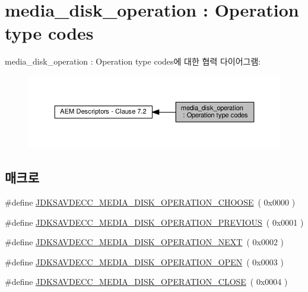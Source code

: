 \hypertarget{group__media__disk__operation}{}\section{media\+\_\+disk\+\_\+operation \+: Operation type codes}
\label{group__media__disk__operation}
media\+\_\+disk\+\_\+operation \+: Operation type codes에 대한 협력 다이어그램\+:
\nopagebreak
\begin{figure}[H]
\begin{center}
\leavevmode
\includegraphics[width=350pt]{group__media__disk__operation}
\end{center}
\end{figure}
\subsection*{매크로}
\begin{DoxyCompactItemize}
\item 
\#define \hyperlink{group__media__disk__operation_ga3db418f81f1a3824a26ede213fb10cc9}{J\+D\+K\+S\+A\+V\+D\+E\+C\+C\+\_\+\+M\+E\+D\+I\+A\+\_\+\+D\+I\+S\+K\+\_\+\+O\+P\+E\+R\+A\+T\+I\+O\+N\+\_\+\+C\+H\+O\+O\+SE}~( 0x0000 )
\item 
\#define \hyperlink{group__media__disk__operation_gab494629109de2f7fd88079bbaa158b0e}{J\+D\+K\+S\+A\+V\+D\+E\+C\+C\+\_\+\+M\+E\+D\+I\+A\+\_\+\+D\+I\+S\+K\+\_\+\+O\+P\+E\+R\+A\+T\+I\+O\+N\+\_\+\+P\+R\+E\+V\+I\+O\+US}~( 0x0001 )
\item 
\#define \hyperlink{group__media__disk__operation_ga3e29e57c7675966b8cc94bf4ff3e8062}{J\+D\+K\+S\+A\+V\+D\+E\+C\+C\+\_\+\+M\+E\+D\+I\+A\+\_\+\+D\+I\+S\+K\+\_\+\+O\+P\+E\+R\+A\+T\+I\+O\+N\+\_\+\+N\+E\+XT}~( 0x0002 )
\item 
\#define \hyperlink{group__media__disk__operation_gab338c10f22049fd6b89a66e4e25a9969}{J\+D\+K\+S\+A\+V\+D\+E\+C\+C\+\_\+\+M\+E\+D\+I\+A\+\_\+\+D\+I\+S\+K\+\_\+\+O\+P\+E\+R\+A\+T\+I\+O\+N\+\_\+\+O\+P\+EN}~( 0x0003 )
\item 
\#define \hyperlink{group__media__disk__operation_ga3fb3b7317ed858d8bac8d9b7efc535b4}{J\+D\+K\+S\+A\+V\+D\+E\+C\+C\+\_\+\+M\+E\+D\+I\+A\+\_\+\+D\+I\+S\+K\+\_\+\+O\+P\+E\+R\+A\+T\+I\+O\+N\+\_\+\+C\+L\+O\+SE}~( 0x0004 )
\end{DoxyCompactItemize}


